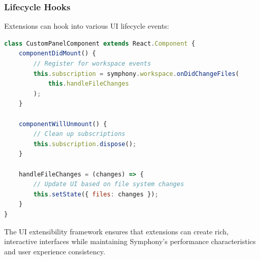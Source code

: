 \subsubsection*{Lifecycle Hooks}

Extensions can hook into various UI lifecycle events:

\begin{lstlisting}[language=JavaScript, caption=UI Component Lifecycle]
class CustomPanelComponent extends React.Component {
    componentDidMount() {
        // Register for workspace events
        this.subscription = symphony.workspace.onDidChangeFiles(
            this.handleFileChanges
        );
    }
    
    componentWillUnmount() {
        // Clean up subscriptions
        this.subscription.dispose();
    }
    
    handleFileChanges = (changes) => {
        // Update UI based on file system changes
        this.setState({ files: changes });
    }
}
\end{lstlisting}

\begin{alertbox}
The UI extensibility framework ensures that extensions can create rich, interactive interfaces while maintaining Symphony's performance characteristics and user experience consistency.
\end{alertbox}
